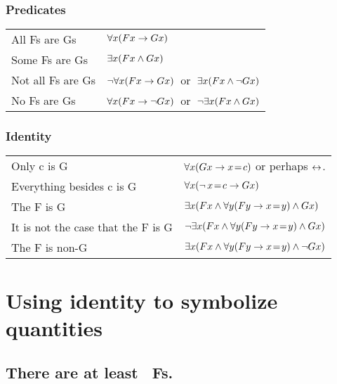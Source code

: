 \subsubsection*{Predicates}
\begin{center}
\begin{tabular*}{\textwidth}{ll}\label{SymbolizingPredicates}
All Fs are Gs & $\forall x(Fx \rightarrow Gx)$\\
Some Fs are Gs & $\exists x(Fx \mathbin{\wedge} Gx)$\\
Not all Fs are Gs & $\neg\forall x(Fx \rightarrow Gx)$\ or\ $\exists x(Fx \mathbin{\wedge} \neg Gx)$\\
No Fs are Gs & $\forall x(Fx \rightarrow\neg Gx)$\ or\ $\neg\exists x(Fx \mathbin{\wedge} Gx)$\\
\end{tabular*}
\end{center}
\subsubsection*{Identity}
\begin{center}
\begin{tabular*}{\textwidth}{ll}
Only c is G & $\forall x(Gx \rightarrow x\!=\! c)$ or perhaps $\leftrightarrow$.  \\
Everything besides c is G & $\forall x(\neg \,x \!=\!  c \rightarrow Gx)$\\
The F is G & $\exists x(Fx \mathbin{\wedge} \forall y(Fy \rightarrow x\!=\! y) \mathbin{\wedge} Gx)$\\
It is not the case that the F is G & $\neg\exists x(Fx \mathbin{\wedge} \forall y(Fy \rightarrow x\!=\! y) \mathbin{\wedge} Gx)$\\
The F is non-G & $\exists x(Fx \mathbin{\wedge} \forall y(Fy \rightarrow x\!=\! y) \mathbin{\wedge} \neg Gx)$
\end{tabular*}
\end{center}







\section{Using identity to symbolize quantities}

\subsection*{There are at least \blank\ Fs.}
\label{summary.atleast}

